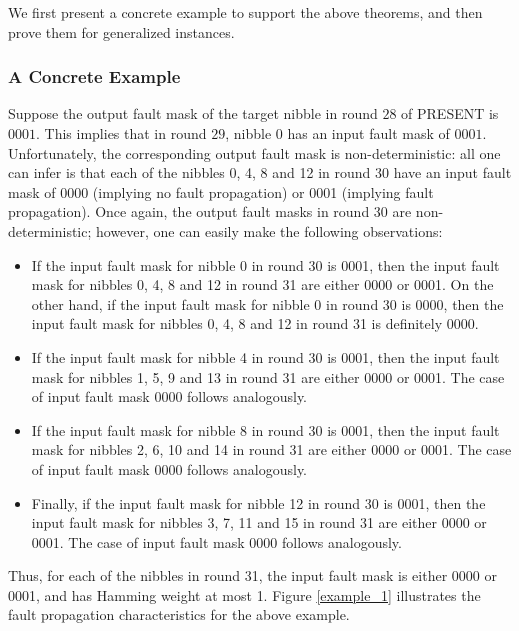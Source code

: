 \documentclass[10pt, conference, compsocconf]{IEEEtran}  %
\numberwithin{Definition}{section}
\numberwithin{Claim}{section}
\begin{document}
\noindent We first present a concrete example to support the above theorems, and then prove them for generalized instances.
\subsubsection{\textbf{A Concrete Example}} Suppose the output fault mask of the target nibble in round $28$ of PRESENT is $0001$. This implies that in round $29$, nibble 0 has an input fault mask of $0001$. Unfortunately, the corresponding output fault mask is non-deterministic: all one can infer is that each of the nibbles 0, 4, 8 and 12 in round 30 have an input fault mask of 0000 (implying no fault propagation) or 0001 (implying fault propagation). Once again, the output fault masks in round 30 are non-deterministic; however, one can easily make the following observations:
\begin{itemize}
\item If the input fault mask for nibble 0 in round 30 is 0001, then the input fault mask for nibbles 0, 4, 8 and 12 in round 31 are either 0000 or 0001. On the other hand, if the input fault mask for nibble 0 in round 30 is 0000, then the input fault mask for nibbles 0, 4, 8 and 12 in round 31 is definitely 0000.

\item If the input fault mask for nibble 4 in round 30 is 0001, then the input fault mask for nibbles 1, 5, 9 and 13 in round 31 are either 0000 or 0001. The case of input fault mask 0000 follows analogously.

\item If the input fault mask for nibble 8 in round 30 is 0001, then the input fault mask for nibbles 2, 6, 10 and 14 in round 31 are either 0000 or 0001. The case of input fault mask 0000 follows analogously.  

\item Finally, if the input fault mask for nibble 12 in round 30 is 0001, then the input fault mask for nibbles 3, 7, 11 and 15 in round 31 are either 0000 or 0001. The case of input fault mask 0000 follows analogously. 
\end{itemize}
\noindent Thus, for each of the nibbles in round 31, the input fault mask is either 0000 or 0001, and has Hamming weight at most 1. Figure \ref{example_1} illustrates the fault propagation characteristics for the above example.\\
\end{document}
